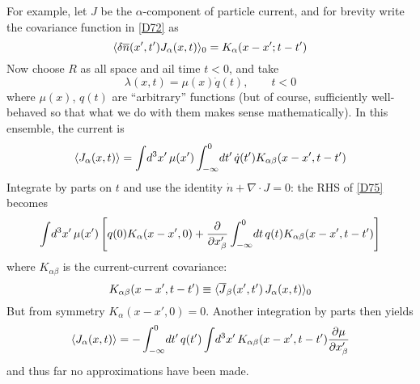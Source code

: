 For example, let $J$ be the $\alpha$-component of particle current, and for brevity write the covariance function in \eqref{D72} as
\begin{equation}
	\label{D73}
	\langle\mathop{}\!\delta \overline{n}(x', t') J_{\alpha} (x, t)\rangle_0 = K_{\alpha}(x - x'; t - t')
\end{equation}
Now choose $R$ as all space and ail time $t < 0$, and take
\begin{equation}
	\label{D74}
	\lambda(x, t) = \mu(x)\dot{q}(t), \qquad t < 0
\end{equation}
where $\mu(x)$, $q(t)$ are ``arbitrary'' functions (but of course, sufficiently well-behaved so that what we do with them makes sense mathematically).
In this ensemble, the current is
\begin{equation}
	\label{D75}
	\langle J_\alpha (x, t)\rangle = \int\! \mathop{}\!d^3 x'\, \mu(x') \int_{-\infty}^{0}\! \mathop{}\!d t'\, \dot{q}(t') K_{\alpha\beta} (x - x', t - t')
\end{equation}
Integrate by parts on $t$ and use the identity $\dot{n} + \nabla\cdot J = 0$: the RHS of \eqref{D75} becomes
\begin{equation}
	\int\! \dd^3 x'\, \mu(x')\, \left[q(0) K_\alpha(x - x', 0) + \pdv{}{x'_\beta} \int_{-\infty}^{0}\! \dd t\, q(t) K_{\alpha\beta}(x - x', t - t') \right]
\end{equation}
where $K_{\alpha\beta}$ is the current-current covariance:
\begin{equation}
	K_{\alpha\beta}(x - x', t - t') \equiv \langle\overline{J}_\beta (x', t')\, J_{\alpha} (x, t)\rangle_0
\end{equation}
But from symmetry $K_\alpha(x - x', 0) = 0$.
Another integration by parts then yields
\begin{equation}
	\langle J_\alpha (x, t)\rangle = - \int_{-\infty}^{0}\! \mathop{}\!d t'\, q(t') \int\! \mathop{}\!d^3 x'\, K_{\alpha\beta} (x - x', t - t') \pdv{\mu}{x'_\beta}
\end{equation}
and thus far no approximations have been made.

